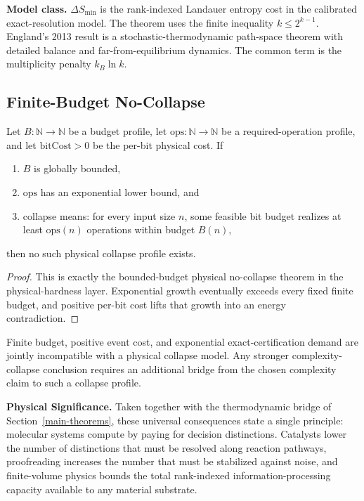 \textbf{Model class.} $\Delta S_{\min}$ is the rank-indexed Landauer entropy cost in the calibrated exact-resolution model. The theorem uses the finite inequality $k \le 2^{k-1}$. England's 2013 result \cite{england2013statistical} is a stochastic-thermodynamic path-space theorem with detailed balance and far-from-equilibrium dynamics. The common term is the multiplicity penalty $k_B \ln k$.

\subsection{Finite-Budget No-Collapse}

\begin{theorem}\label{thm:finite-budget-no-collapse}
Let $B : \mathbb{N} \to \mathbb{N}$ be a budget profile, let $\mathrm{ops} : \mathbb{N} \to \mathbb{N}$ be a required-operation profile, and let $\mathrm{bitCost} > 0$ be the per-bit physical cost. If
\begin{enumerate}
\item $B$ is globally bounded,
\item $\mathrm{ops}$ has an exponential lower bound, and
\item collapse means: for every input size $n$, some feasible bit budget realizes at least $\mathrm{ops}(n)$ operations within budget $B(n)$,
\end{enumerate}
then no such physical collapse profile exists.
\end{theorem}

\begin{proof}
This is exactly the bounded-budget physical no-collapse theorem in the physical-hardness layer. Exponential growth eventually exceeds every fixed finite budget, and positive per-bit cost lifts that growth into an energy contradiction.
\end{proof}

\begin{remark}[Interpretation]
Finite budget, positive event cost, and exponential exact-certification demand are jointly incompatible with a physical collapse model. Any stronger complexity-collapse conclusion requires an additional bridge from the chosen complexity claim to such a collapse profile.
\end{remark}

\textbf{Physical Significance.} Taken together with the thermodynamic bridge of Section~\ref{main-theorems}, these universal consequences state a single principle: molecular systems compute by paying for decision distinctions. Catalysts lower the number of distinctions that must be resolved along reaction pathways, proofreading increases the number that must be stabilized against noise, and finite-volume physics bounds the total rank-indexed information-processing capacity available to any material substrate.

